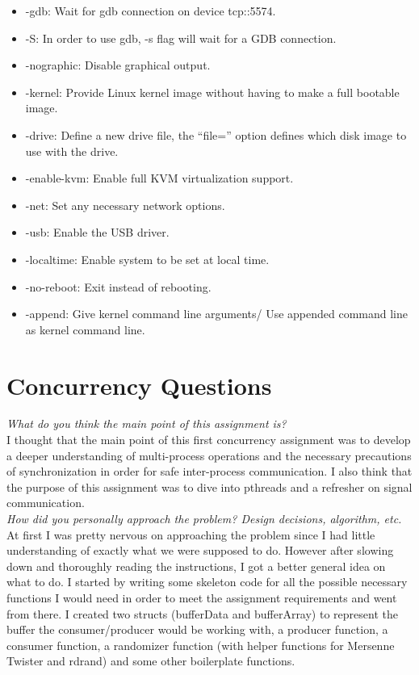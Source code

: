 \documentclass[letterpaper,10pt,titlepage]{article}
\begin{document}
\begin{itemize}
  \item -gdb: Wait for gdb connection on device tcp::5574.
  \item -S: In order to use gdb, -s flag will wait for a GDB connection.
  \item -nographic: Disable graphical output.
  \item -kernel: Provide Linux kernel image without having to make a full bootable image.
  \item -drive: Define a new drive file, the “file=” option defines which disk image to use with the drive.
  \item -enable-kvm: Enable full KVM virtualization support.
  \item -net: Set any necessary network options.
  \item -usb: Enable the USB driver.
  \item -localtime: Enable system to be set at local time.
  \item -no-reboot: Exit instead of rebooting.
  \item -append: Give kernel command line arguments/ Use appended command line as kernel command line.

\end{itemize}

\newpage

\section{Concurrency Questions}

\textit{What do you think the main point of this assignment is?}\\

I thought that the main point of this first concurrency
assignment was to develop a deeper understanding of
multi-process operations and the necessary precautions of
synchronization in order for safe inter-process communication.
I also think that the purpose of this assignment was to dive into pthreads and a refresher on signal communication.\\

\textit{How did you personally approach the problem? Design decisions, algorithm, etc.}\\

At first I was pretty nervous on approaching the problem since I had little understanding of exactly what we were supposed to do.  However after slowing down and thoroughly reading the instructions, I got a better general idea on what to do.  I started by writing some skeleton code for all the possible necessary functions I would need in order to meet the assignment requirements and went from there.  I created two structs (bufferData and bufferArray) to represent the buffer the consumer/producer would be working with, a producer function, a consumer function, a randomizer function (with helper functions for Mersenne Twister and rdrand) and some other boilerplate functions.\\
\end{document}
